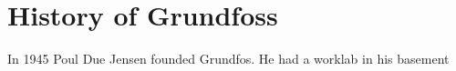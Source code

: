 \chapter{History of Grundfoss} \label{ch:History of Grundfoss}

In 1945 Poul Due Jensen founded Grundfos. He had a worklab in his basement